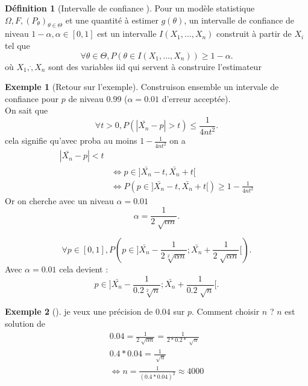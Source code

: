 \documentclass{article}
\theoremstyle{plain}%
\theoremstyle{definition}
\newtheorem{defn}{Définition}[section]
\newtheorem{exmp}{Exemple}[section]
\theoremstyle{remark}
\begin{document}
\begin{defn}[Intervalle de confiance ]
    Pour un modèle statistique $ \Omega, F, (P_{\theta })_{\theta \in \Theta } $ et une quantité à estimer $ g(\theta ) $, un intervalle de confiance de niveau $ 1-\alpha, \alpha \in [0,1] $ est un intervalle $ I(X_1, ..., X_n) $ construit à partir de $ X_i $ tel que 
    \[
        \forall \theta  \in \Theta , P(\theta \in I(X_1, \dots, X _{n} )) \geq 1- \alpha 
        .\]
        où $ X_1, \dot, X _{n}  $ sont des variables iid qui servent à construire l'estimateur
    \end{defn}
    \begin{exmp}[Retour sur l'exemple]
        Construison ensemble un intervale de confiance pour $ p $ de niveau 0.99 ($ \alpha = 0.01 $ d'erreur acceptée).\\
        On sait que 
        \[
            \forall t > 0, P(\left| \bar{X_n}-p \right| > t) \leq \frac{1}{4nt^2}
            .\]
            cela signifie qu'avec proba au moins $ 1-\frac{1}{4nt^2} $ on a 
            \begin{align*}
                \left| \bar{X_n}-p \right| < t \\
                &\Leftrightarrow p \in ]\bar{X_n} - t, \bar{X_n} + t [ \\
                &\Leftrightarrow P(p \in ]\bar{X_n} - t, \bar{X_n} + t [ ) \geq 1-\frac{1}{4nt^2}
            \end{align*}
            Or on cherche avec un niveau $ \alpha = 0.01 $ 
    \[
        \alpha = \frac{1}{2 \sqrt[]{\alpha n}}
    .\]
    
    \[
        \forall p \in [0,1], P(p \in ] \bar{X_n}- \frac{1}{2 \sqrt[2]{\alpha n}}; \bar{X_n}+ \frac{1}{2 \sqrt[]{\alpha n}}[)
    .\]
    Avec $ \alpha = 0.01$ cela devient : 
    \[
        p \in ] \bar{X_n}- \frac{1}{0.2 \sqrt[2]{n}}; \bar{X_n}+ \frac{1}{0.2 \sqrt[]{n}}[
    .\]
\end{exmp}
\begin{exmp}[]
    je veux une précision de $ 0.04 $ sur $ p $. Comment choisir $ n $ ? $ n $ est solution de 
    \begin{align*}
        0.04 = \frac{1}{2 \sqrt[]{\alpha n}} = \frac{1}{2*0.2 * \sqrt[]{n}} \\
        0.4*0.04 = \frac{1}{\sqrt[]{n}} \\
        \Leftrightarrow n= \frac{1}{(0.4*0.04)^2} \approx 4000
    \end{align*}
\end{exmp}
\end{document}

